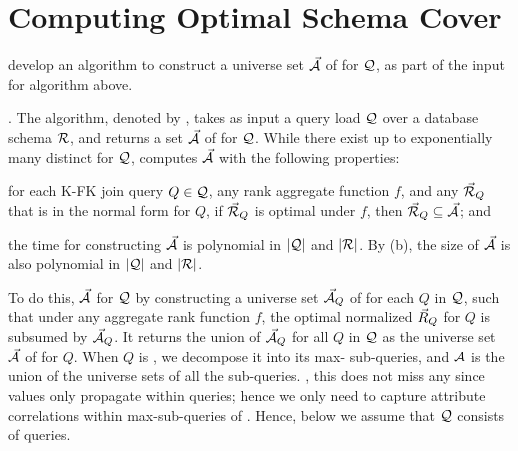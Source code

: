 \vspace{-0.3ex}
\section{Computing Optimal Schema Cover}
\label{sec-cover}
\vspace{-0.4ex}

 develop an algorithm to construct a universe set
$\vec{{\mathcal A}}$ of \bss for $\mathcal Q$, as part of the input for algorithm
\opts above. %

. The algorithm, denoted by \usc, takes as input a
query load $\mathcal Q$
over a database schema ${\mathcal R}$, and returns a set $\vec{{\mathcal A}}$ of \bss
for $\mathcal Q$.
While there exist up to exponentially many distinct \bss for
$\mathcal Q$, \usc computes $\vec{{\mathcal A}}$ with the following properties:
\mbi
\item[(a)] for each K-FK join \SPC query $Q\in \mathcal Q$, any rank aggregate function $f$,
  and any \bds $\vec{{\mathcal R}}_{Q}$ that is in the normal form for $Q$,
  if $\vec{{\mathcal R}}_{Q}$ is optimal under $f$, then
  $\vec{{\mathcal R}}_{Q}\subseteq \vec{{\mathcal A}}$; and
\item[(b)] the time for constructing $\vec{{\mathcal A}}$ is polynomial in
  $|\mathcal Q|$ and $|{\mathcal R}|$.
\mei
\vspace{-0.4ex}
By (b), the size of $\vec{{\mathcal A}}$ is also polynomial in
$|\mathcal Q|$ and $|{\mathcal R}|$.

\vspace{0.36ex}
To do this,  %
$\vec{{\mathcal A}}$ for $\mathcal Q$ by
constructing a universe set $\vec{{\mathcal A}}_{Q}$ of \bss for each
$Q$ in $\mathcal Q$,
such that under any aggregate rank function $f$, the optimal
normalized \bds $\vec{R}_{Q}$ for $Q$ is %
subsumed by $\vec{{\mathcal A}}_{Q}$.
It returns the union of $\vec{{\mathcal A}}_{Q}$ for all $Q$ in $\mathcal Q$ as
the universe set $\vec{{\mathcal A}}$ of \bss for $Q$.
%
When $Q$ is , we decompose it into its max-\SPC
sub-queries, and ${\mathsf{{\mathcal A}}}$ is the union of the universe sets of
  all the sub-queries. ,
  this does not miss any  since values only propagate
  within \SPC queries; hence we
  only need to capture attribute correlations within
  max-\SPC sub-queries of \SQL.
Hence, below we assume that $\mathcal Q$ consists of \SPC queries.

